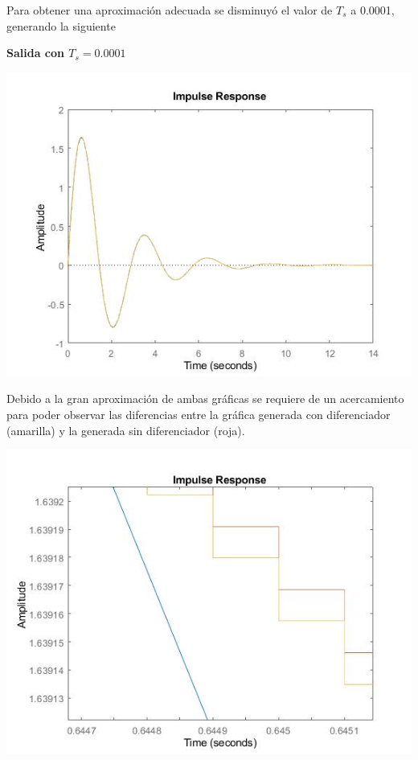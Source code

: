 Para obtener una aproximación adecuada se disminuyó el valor de $T_s$ a 0.0001, generando la siguiente 
\newline

\noindent \textbf{Salida con $T_s=0.0001$}

\noindent \includegraphics[scale=0.6]{./ImagenParte1y2/SalidaTs00001DosHz}

Debido a la gran aproximación de ambas gráficas se requiere de un acercamiento para poder observar las diferencias entre la gráfica generada con diferenciador (amarilla) y la generada sin diferenciador (roja).

\noindent \includegraphics[scale=0.6]{./ImagenParte1y2/SalidaTs00001DosHzAcercamiento}

